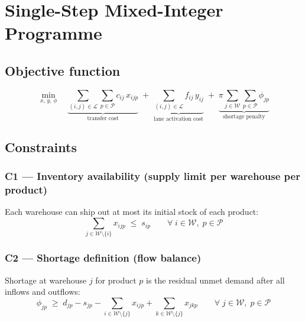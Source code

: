 \documentclass[11pt, a4paper]{article}
\begin{document}
\section{Single-Step Mixed-Integer Programme}

\subsection{Objective function}

\begin{equation}
  \min_{x,\, y,\, \phi} \quad
  \underbrace{\sum_{(i,j)\in\mathcal{L}}\sum_{p\in\mathcal{P}}
    c_{ij}\, x_{ijp}}_{\text{transfer cost}}
  \;+\;
  \underbrace{\sum_{(i,j)\in\mathcal{L}}
    f_{ij}\, y_{ij}}_{\text{lane activation cost}}
  \;+\;
  \underbrace{\pi \sum_{j\in\mathcal{W}}\sum_{p\in\mathcal{P}}
    \phi_{jp}}_{\text{shortage penalty}}
  \tag{OBJ}
\end{equation}

\subsection{Constraints}

\subsubsection*{C1 — Inventory availability (supply limit per warehouse per product)}

Each warehouse can ship out at most its initial stock of each product:
\begin{equation}
  \sum_{j \in \mathcal{W} \setminus \{i\}} x_{ijp}
  \;\leq\; s_{ip}
  \qquad \forall\; i \in \mathcal{W},\; p \in \mathcal{P}
  \tag{C1}
\end{equation}

\subsubsection*{C2 — Shortage definition (flow balance)}

Shortage at warehouse $j$ for product $p$ is the residual unmet demand
after all inflows and outflows:
\begin{equation}
  \phi_{jp}
  \;\geq\;
  d_{jp}
  - s_{jp}
  - \sum_{i \in \mathcal{W} \setminus \{j\}} x_{ijp}
  + \sum_{k \in \mathcal{W} \setminus \{j\}} x_{jkp}
  \qquad \forall\; j \in \mathcal{W},\; p \in \mathcal{P}
  \tag{C2}
\end{equation}
\end{document}
